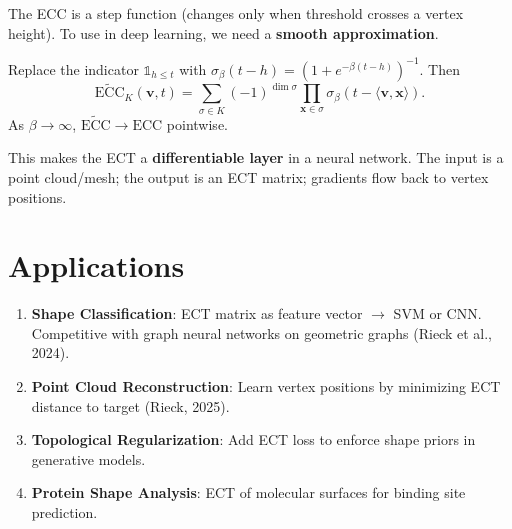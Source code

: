 The ECC is a step function (changes only when threshold crosses a vertex height). To use in deep learning, we need a \textbf{smooth approximation}.

\begin{proposition}
Replace the indicator $\mathbb{1}_{h \le t}$ with $\sigma_\beta(t - h) = (1 + e^{-\beta(t-h)})^{-1}$. Then
\[
\widetilde{\mathrm{ECC}}_K(\bm{v}, t) = \sum_{\sigma \in K} (-1)^{\dim \sigma} \prod_{\bm{x} \in \sigma} \sigma_\beta(t - \langle \bm{v}, \bm{x} \rangle).
\]
As $\beta \to \infty$, $\widetilde{\mathrm{ECC}} \to \mathrm{ECC}$ pointwise.
\end{proposition}

This makes the ECT a \textbf{differentiable layer} in a neural network. The input is a point cloud/mesh; the output is an ECT matrix; gradients flow back to vertex positions.

\section{Applications}
\label{sec:ect:apps}

\begin{enumerate}
    \item \textbf{Shape Classification}: ECT matrix as feature vector $\to$ SVM or CNN. Competitive with graph neural networks on geometric graphs (Rieck et al., 2024).
    \item \textbf{Point Cloud Reconstruction}: Learn vertex positions by minimizing ECT distance to target (Rieck, 2025).
    \item \textbf{Topological Regularization}: Add ECT loss to enforce shape priors in generative models.
    \item \textbf{Protein Shape Analysis}: ECT of molecular surfaces for binding site prediction.
\end{enumerate}

